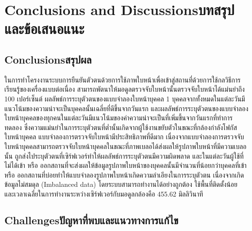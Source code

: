 \chapter{\ifenglish Conclusions and Discussions\else บทสรุปและข้อเสนอแนะ\fi}

\section{\ifenglish Conclusions\else สรุปผล\fi}

ในการทำโครงงานระบบการยืนยันตัวตนด้วยการใช้ภาพใบหน้าเพื่อเข้าสู่สถานที่ด้วยการใช้กลวิธีการเรียนรู้ของเครื่องแบบต่อเนื่อง สามารถพัตนาให้มอดูลตรวจจับใบหน้านั้นตรวจจับใบหน้าได้แม่นยำถึง 100 เปอร์เซ็นต์ 
ผลลัพธ์การระบุตัวตนของแบบจำลองใบหน้าบุคคล 1 บุคคลจากทั้งหมดในแต่ละวันมีแนวโน้มของความน่าจะเป็นบุคคลนั้นเฉลี่ยที่ดีขึ้นจากวันแรก และผลลัพธ์การระบุตัวตนของแบบจำลองใบหน้าบุคคลของทุกคนในแต่ละวันมีแนวโน้มของค่าความน่าจะเป็นที่เพิ่มขึ้นจากวันแรกที่ทำการทดลอง 
ซึ่งความแม่นยำในการระบุตัวตนที่ต่ำนั้นเกิดจากผู้ใช้งานขยับตัวในขณะที่กล้องกำลังโฟกัสใบหน้าบุคคล แบบจำลองการตรวจจับใบหน้ามีประสิทธิภาพที่ดีมาก เนื่องจากแบบจำลองการตรวจจับใบหน้าบุคคลสามารถตรวจจับใบหน้าบุคคลในขณะที่ภาพเบลอได้ส่งผลให้รูปภาพใบหน้าที่มีความเบลอนั้น
ถูกส่งไประบุตัวตนที่เซิร์ฟเวอร์ทำให้ผลลัพธ์การระบุตัวตนมีความผิดพลาด และในแต่ละวันผู้ใช้ที่ไม่ได้เข้า หรือ ออกสถานที่จะส่งผลให้ข้อมูลรูปภาพใบหน้าของบุคคลนั้นมีจำนวนที่น้อยกว่าบุคคลที่เข้า หรือ ออกสถานที่บ่อยทำให้แบบจำลองรูปภาพใบหน้าเกิดความลำเอียงในการระบุตัวตน 
เนื่องจากเกิดข้อมูลไม่สมดุล (Imbalanced data) โดยระบบสามารถทำงานได้อย่างถูกต้อง ใช้พื้นที่ติดตั้งน้อย และเวลาเฉลี่ยในการทำงานระหว่างเซิร์ฟเวอร์กับมอดูลกล้องคือ 455.62 มิลลิวินาที 


\section{\ifenglish Challenges\else ปัญหาที่พบและแนวทางการแก้ไข\fi}

